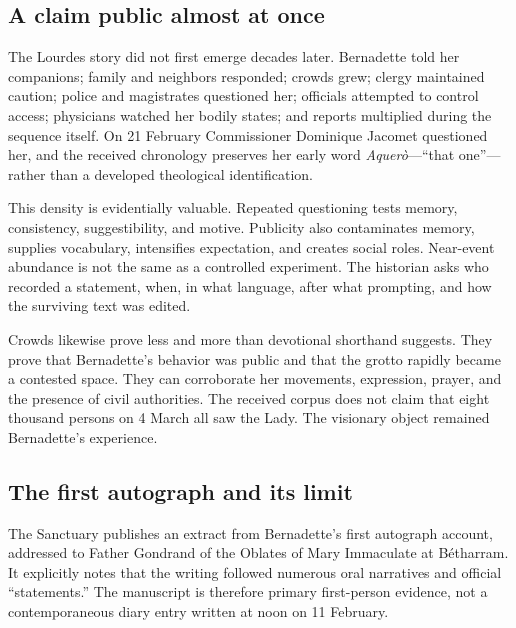 \subsection{A claim public almost at once}

The Lourdes story did not first emerge decades later. Bernadette told her companions; family and neighbors responded; crowds grew; clergy maintained caution; police and magistrates questioned her; officials attempted to control access; physicians watched her bodily states; and reports multiplied during the sequence itself. On 21 February Commissioner Dominique Jacomet questioned her, and the received chronology preserves her early word \emph{Aquerò}---“that one”---rather than a developed theological identification.

This density is evidentially valuable. Repeated questioning tests memory, consistency, suggestibility, and motive. Publicity also contaminates memory, supplies vocabulary, intensifies expectation, and creates social roles. Near-event abundance is not the same as a controlled experiment. The historian asks who recorded a statement, when, in what language, after what prompting, and how the surviving text was edited.

Crowds likewise prove less and more than devotional shorthand suggests. They prove that Bernadette's behavior was public and that the grotto rapidly became a contested space. They can corroborate her movements, expression, prayer, and the presence of civil authorities. The received corpus does not claim that eight thousand persons on 4 March all saw the Lady. The visionary object remained Bernadette's experience.


\subsection{The first autograph and its limit}

The Sanctuary publishes an extract from Bernadette's first autograph account, addressed to Father Gondrand of the Oblates of Mary Immaculate at Bétharram. It explicitly notes that the writing followed numerous oral narratives and official “statements.” The manuscript is therefore primary first-person evidence, not a contemporaneous diary entry written at noon on 11 February.

